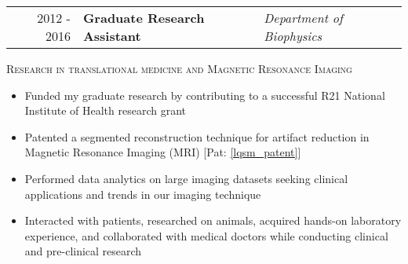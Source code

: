 

\begin{minipage}{\textwidth}
    \begin{tabular}{r|ll}
	2012 - 2016 & \textbf{Graduate Research Assistant} & \textit{Department of Biophysics}  \\
    \end{tabular}
\end{minipage}

\begin{center}
    \begin{minipage}{0.9\textwidth}
	\begin{center}
	    \textsc{\Large Research in translational medicine and Magnetic Resonance Imaging} \vspace{2mm}
	\end{center}
    \end{minipage}
\end{center}

\begin{minipage}{\textwidth}
    \begin{center}
   	\begin{itemize}
	    \item Funded my graduate research by contributing to a successful R21 National Institute of Health research grant
	    \item Patented a segmented reconstruction technique for artifact reduction in Magnetic Resonance Imaging (MRI) [Pat: \ref{lqsm_patent}]
	    \item Performed data analytics on large imaging datasets seeking clinical applications and trends in our imaging technique
	    \item Interacted with patients, researched on animals, acquired hands-on laboratory experience, and collaborated with medical doctors while conducting clinical and pre-clinical research
	\end{itemize}
    \end{center}
\end{minipage}

